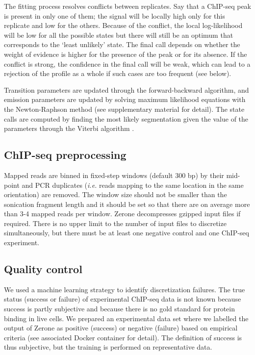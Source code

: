 \documentclass{bioinfo}
\begin{document}
\begin{methods}
The fitting process resolves conflicts between replicates. Say that
a ChIP-seq peak is present in only one of them; the signal
will be locally high only for this replicate and low for the others.
Because of the conflict, the local log-likelihood will be low for
all the possible states but there will still be an optimum that
corresponds to the `least unlikely' state. The final call depends on
whether the weight of evidence is higher for the presence of the
peak or for its absence. If the conflict is strong, the confidence
in the final call will be weak, which can lead to a rejection of
the profile as a whole if such cases are too frequent (see below).

Transition parameters are updated through the forward-backward
algorithm, and emission parameters are updated by solving maximum
likelihood equations with the Newton-Raphson method (see supplementary
material for detail). The state calls are computed by finding the most
likely segmentation given the value of the parameters through the Viterbi
algorithm \citep{1054010}.

\subsection{ChIP-seq preprocessing}
Mapped reads are binned in fixed-step windows (default 300
bp) by their mid-point and PCR duplicates (\textit{i.e.} reads mapping to
the same location in the same orientation) are removed. The window size
should not be smaller than the sonication fragment length and
it should be set so that there are on average more than 3-4 mapped reads
per window. Zerone decompresses gzipped input files if required. There is
no upper limit to the number of input files to discretize simultaneously,
but there must be at least one negative control and one ChIP-seq experiment.

\subsection{Quality control}
\label{sub:training}
We used a machine learning strategy to identify discretization
failures. The true status (success or failure) of experimental ChIP-seq
data is not known because success is partly subjective and because
there is no gold standard for protein binding in live cells.
We prepared an experimental data set where we labelled the
output of Zerone as positive (success) or negative (failure) based
on empirical criteria (see associated Docker container for detail).
The definition of success is thus subjective, but the training is
performed on representative data.


\end{methods}
\end{document}
